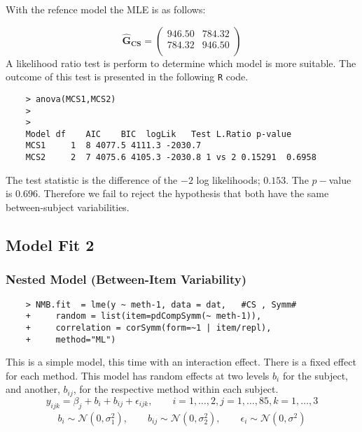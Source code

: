 \documentclass[12pt, a4paper]{report}
\theoremstyle{plain}
\theoremstyle{definition}
\theoremstyle{remark}
\begin{document}
	With the refence model the MLE is as follows:
	
	\begin{equation}
	\boldsymbol{\hat{G}_{CS}} = \left( \begin{array}{cc}
	946.50 & 784.32  \\
	784.32 & 946.50  \\
	\end{array}\right)
	\end{equation}
	A likelihood ratio test is perform to determine which model is more suitable. The outcome of this test is presented in the following \texttt{R} code.
	\begin{framed}
	\begin{verbatim}
	> anova(MCS1,MCS2)
	>
	>
	Model df    AIC    BIC  logLik   Test L.Ratio p-value
	MCS1     1  8 4077.5 4111.3 -2030.7
	MCS2     2  7 4075.6 4105.3 -2030.8 1 vs 2 0.15291  0.6958
	\end{verbatim}
	\end{framed}
	
	The test statistic is the difference of the $-2$ log likelihoods; $0.153$. The $p-$value is $0.696$. Therefore we fail to reject the hypothesis that both have the same between-subject variabilities.
	
	\subsection{Model Fit 2}
\subsubsection{Nested Model (Between-Item Variability)}
\begin{framed}
	\begin{verbatim}
	> NMB.fit  = lme(y ~ meth-1, data = dat,   #CS , Symm#
	+     random = list(item=pdCompSymm(~ meth-1)),
	+     correlation = corSymm(form=~1 | item/repl), 
	+     method="ML")
	\end{verbatim}
\end{framed}

	

	This is a simple model, this time with an interaction effect.
	There is a fixed effect for each method. This model has random effects at two levels $b_{i}$ for the subject, and
	another, $b_{ij}$, for the respective method within each subject.
	\begin{equation*}
	y_{ijk} = \beta_{j}  + b_{i} + b_{ij} + \epsilon_{ijk}, \qquad i=1,\dots,2, j=1,\dots,85, k=1,\dots,3
	\end{equation*}
	\begin{eqnarray*}
		b_{i} \sim \mathcal{N}(0,\sigma^2_{1}), \qquad b_{ij} \sim \mathcal{N}(0,\sigma^2_{2}), \qquad \epsilon_{i} \sim \mathcal{N}(0,\sigma^2)
	\end{eqnarray*}
	
\end{document}
